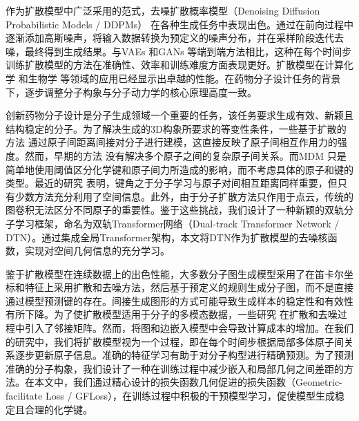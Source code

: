 作为扩散模型中广泛采用的范式，去噪扩散概率模型（Denoising Diffusion Probabilistic Models / DDPMs） \cite{ddpm_ho_20,dpm_jascha_15}在各种生成任务中表现出色。通过在前向过程中逐渐添加高斯噪声，将输入数据转换为预定义的噪声分布，并在采样阶段迭代去噪，最终得到生成结果。与VAEs \cite{vae_kingma_13}和GANs \cite{gan_goodfellow_14}等端到端方法相比，这种在每个时间步训练扩散模型的方法在准确性、效率和训练难度方面表现更好。扩散模型在计算化学 \cite{edm_hoogeboom_22,targetdiff_guan_23}和生物学 \cite{diffab_luo_22,protseed_shi_23}等领域的应用已经显示出卓越的性能。在药物分子设计任务的背景下，逐步调整分子构象与分子动力学的核心原理高度一致。

创新药物分子设计是分子生成领域一个重要的任务，该任务要求生成有效、新颖且结构稳定的分子。为了解决生成的3D构象所要求的等变性条件，一些基于扩散的方法 \cite{edm_hoogeboom_22,mdm_huang_23}通过原子间距离间接对分子进行建模，这直接反映了原子间相互作用力的强度。然而，早期的方法 \cite{edm_hoogeboom_22}没有解决多个原子之间的复杂原子间关系。而MDM \cite{mdm_huang_23}只是简单地使用阈值区分化学键和原子间力所造成的影响，而不考虑具体的原子和键的类型。最近的研究 \cite{moleformer_yuan_23}表明，键角之于分子学习与原子对间相互距离同样重要，但只有少数方法充分利用了空间信息。此外，由于分子扩散方法只作用于点云，传统的图卷积无法区分不同原子的重要性。鉴于这些挑战，我们设计了一种新颖的双轨分子学习框架，命名为双轨Transformer网络（Dual-track Transformer Network / DTN）。通过集成全局Transformer架构，本文将DTN作为扩散模型的去噪核函数，实现对空间几何信息的充分学习。

鉴于扩散模型在连续数据上的出色性能，大多数分子图生成模型采用了在笛卡尔坐标和特征上采用扩散和去噪方法，然后基于预定义的规则生成分子图，而不是直接通过模型预测键的存在。间接生成图形的方式可能导致生成样本的稳定性和有效性有所下降。为了使扩散模型适用于分子的多模态数据，一些研究 \cite{edpgnn_niu_20,digress_vignac_22,midi_vignac_23}在扩散和去噪过程中引入了邻接矩阵。然而，将图和边嵌入模型中会导致计算成本的增加。在我们的研究中，我们将扩散模型视为一个过程，即在每个时间步根据局部多体原子间关系逐步更新原子信息。准确的特征学习有助于对分子构型进行精确预测。为了预测准确的分子构象，我们设计了一种在训练过程中减少嵌入和局部几何之间差距的方法。在本文中，我们通过精心设计的损失函数几何促进的损失函数（Geometric-facilitate Loss / GFLoss），在训练过程中积极的干预模型学习，促使模型生成稳定且合理的化学键。

